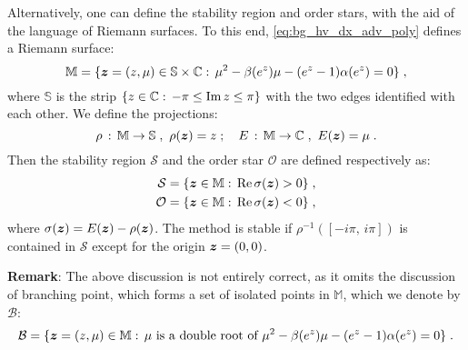 Alternatively, one can define the stability region and order stars, with the aid of the language of Riemann surfaces.
To this end, \cref{eq:bg_hv_dx_adv_poly} defines a Riemann surface:
\begin{equation}\label{eq:bg_hv_dx_adv_rs}
  \mathbb{M} = \{\boldsymbol{z}=(z,\mu)\in\mathbb{S}\times\mathbb{C}:\,\mu^2-\beta(e^z)\mu-(e^z-1)\alpha(e^z)=0\}\;,
\end{equation}
where $\mathbb{S}$ is the strip $\{z\in\mathbb{C}:\,-\pi\le\operatorname{Im}z\le\pi\}$ with the two edges identified with each other.
We define the projections:
\begin{equation}\label{eq:bg_hv_dx_adv_proj}
  \rho\,:\,\mathbb{M}\rightarrow\mathbb{S}\;,\ \rho(\boldsymbol{z})=z\;;\quad
  E\,:\,\mathbb{M}\rightarrow\mathbb{C}\;,\ E(\boldsymbol{z})=\mu\;.
\end{equation}
Then the stability region $\mathcal{S}$ and the order star $\mathcal{O}$ are defined respectively as:
\begin{align}
  \label{eq:bg_hv_dx_adv_stab}
  \mathcal{S} &= \{\boldsymbol{z}\in\mathbb{M}:\,\operatorname{Re}\sigma(\boldsymbol{z})>0\}\;, \\
  \label{eq:bg_hv_dx_adv_os}
  \mathcal{O} &= \{\boldsymbol{z}\in\mathbb{M}:\,\operatorname{Re}\sigma(\boldsymbol{z})<0\}\;,
\end{align}
where $\sigma(\boldsymbol{z}) = E(\boldsymbol{z}) - \rho(\boldsymbol{z})$.
The method is stable if $\rho^{-1}([-i\pi,\,i\pi])$ is contained in $\mathcal{S}$ except for the origin $\boldsymbol{z}=(0,0)$.

{\bf Remark}: The above discussion is not entirely correct, as it omits the discussion of branching point, which forms a set of isolated points in $\mathbb{M}$, which we denote by $\mathcal{B}$:
\begin{equation}\label{eq:bg_hv_dx_adv_br}
  \mathcal{B} = \{\boldsymbol{z}=(z,\mu)\in\mathbb{M}:\,\mu \textrm{ is a double root of } \mu^2-\beta(e^z)\mu-(e^z-1)\alpha(e^z)=0\}\;.
\end{equation}
